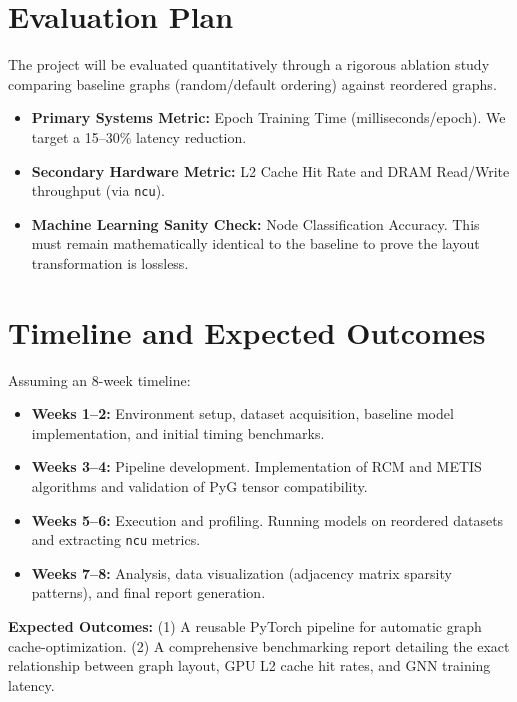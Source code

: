 \documentclass[sigconf,review]{acmart}
\begin{document}
\section{Evaluation Plan}
The project will be evaluated quantitatively through a rigorous ablation study comparing baseline graphs (random/default ordering) against reordered graphs. 

\begin{itemize}
    \item \textbf{Primary Systems Metric:} Epoch Training Time (milliseconds/epoch). We target a 15--30\% latency reduction.
    \item \textbf{Secondary Hardware Metric:} L2 Cache Hit Rate and DRAM Read/Write throughput (via \texttt{ncu}).
    \item \textbf{Machine Learning Sanity Check:} Node Classification Accuracy. This must remain mathematically identical to the baseline to prove the layout transformation is lossless.
\end{itemize}

\section{Timeline and Expected Outcomes}
Assuming an 8-week timeline:
\begin{itemize}
    \item \textbf{Weeks 1--2:} Environment setup, dataset acquisition, baseline model implementation, and initial timing benchmarks.
    \item \textbf{Weeks 3--4:} Pipeline development. Implementation of RCM and METIS algorithms and validation of PyG tensor compatibility.
    \item \textbf{Weeks 5--6:} Execution and profiling. Running models on reordered datasets and extracting \texttt{ncu} metrics.
    \item \textbf{Weeks 7--8:} Analysis, data visualization (adjacency matrix sparsity patterns), and final report generation.
\end{itemize}

\textbf{Expected Outcomes:} 
(1) A reusable PyTorch pipeline for automatic graph cache-optimization. (2) A comprehensive benchmarking report detailing the exact relationship between graph layout, GPU L2 cache hit rates, and GNN training latency.



\end{document}
